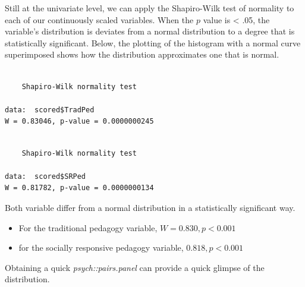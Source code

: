 \documentclass[
  11pt,
]{book}
\newenvironment{Shaded}{\begin{snugshade}}{\end{snugshade}}
\newcommand{\CommentTok}[1]{\textcolor[rgb]{0.37,0.37,0.37}{\textit{#1}}}
\newcommand{\FunctionTok}[1]{\textcolor[rgb]{0.27,0.27,0.27}{\textbf{#1}}}
\newcommand{\NormalTok}[1]{#1}
\newcommand{\SpecialCharTok}[1]{\textcolor[rgb]{0.43,0.43,0.43}{\textbf{#1}}}
\providecommand{\tightlist}{%
  \setlength{\itemsep}{0pt}\setlength{\parskip}{0pt}}
\begin{document}
Still at the univariate level, we can apply the Shapiro-Wilk test of normality to each of our continuously scaled variables. When the \(p\) value is \textless{} .05, the variable's distribution is deviates from a normal distribution to a degree that is statistically significant. Below, the plotting of the histogram with a normal curve superimposed shows how the distribution approximates one that is normal.

\begin{Shaded}
\end{Shaded}

\begin{verbatim}

    Shapiro-Wilk normality test

data:  scored$TradPed
W = 0.83046, p-value = 0.0000000245
\end{verbatim}

\begin{Shaded}
\end{Shaded}

\begin{verbatim}

    Shapiro-Wilk normality test

data:  scored$SRPed
W = 0.81782, p-value = 0.0000000134
\end{verbatim}

Both variable differ from a normal distribution in a statistically significant way.

\begin{itemize}
\tightlist
\item
  For the traditional pedagogy variable, \(W = 0.830, p < 0.001\)
\item
  for the socially responsive pedagogy variable, \(0.818, p < 0.001\)
\end{itemize}

Obtaining a quick \emph{psych::pairs.panel} can provide a quick glimpse of the distribution.
\end{document}
